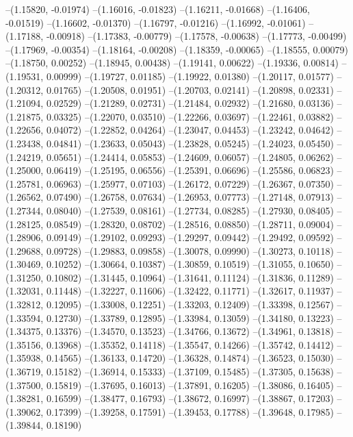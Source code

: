 --(1.15820, -0.01974)
--(1.16016, -0.01823)
--(1.16211, -0.01668)
--(1.16406, -0.01519)
--(1.16602, -0.01370)
--(1.16797, -0.01216)
--(1.16992, -0.01061)
--(1.17188, -0.00918)
--(1.17383, -0.00779)
--(1.17578, -0.00638)
--(1.17773, -0.00499)
--(1.17969, -0.00354)
--(1.18164, -0.00208)
--(1.18359, -0.00065)
--(1.18555, 0.00079)
--(1.18750, 0.00252)
--(1.18945, 0.00438)
--(1.19141, 0.00622)
--(1.19336, 0.00814)
--(1.19531, 0.00999)
--(1.19727, 0.01185)
--(1.19922, 0.01380)
--(1.20117, 0.01577)
--(1.20312, 0.01765)
--(1.20508, 0.01951)
--(1.20703, 0.02141)
--(1.20898, 0.02331)
--(1.21094, 0.02529)
--(1.21289, 0.02731)
--(1.21484, 0.02932)
--(1.21680, 0.03136)
--(1.21875, 0.03325)
--(1.22070, 0.03510)
--(1.22266, 0.03697)
--(1.22461, 0.03882)
--(1.22656, 0.04072)
--(1.22852, 0.04264)
--(1.23047, 0.04453)
--(1.23242, 0.04642)
--(1.23438, 0.04841)
--(1.23633, 0.05043)
--(1.23828, 0.05245)
--(1.24023, 0.05450)
--(1.24219, 0.05651)
--(1.24414, 0.05853)
--(1.24609, 0.06057)
--(1.24805, 0.06262)
--(1.25000, 0.06419)
--(1.25195, 0.06556)
--(1.25391, 0.06696)
--(1.25586, 0.06823)
--(1.25781, 0.06963)
--(1.25977, 0.07103)
--(1.26172, 0.07229)
--(1.26367, 0.07350)
--(1.26562, 0.07490)
--(1.26758, 0.07634)
--(1.26953, 0.07773)
--(1.27148, 0.07913)
--(1.27344, 0.08040)
--(1.27539, 0.08161)
--(1.27734, 0.08285)
--(1.27930, 0.08405)
--(1.28125, 0.08549)
--(1.28320, 0.08702)
--(1.28516, 0.08850)
--(1.28711, 0.09004)
--(1.28906, 0.09149)
--(1.29102, 0.09293)
--(1.29297, 0.09442)
--(1.29492, 0.09592)
--(1.29688, 0.09728)
--(1.29883, 0.09858)
--(1.30078, 0.09990)
--(1.30273, 0.10118)
--(1.30469, 0.10252)
--(1.30664, 0.10387)
--(1.30859, 0.10519)
--(1.31055, 0.10650)
--(1.31250, 0.10802)
--(1.31445, 0.10964)
--(1.31641, 0.11124)
--(1.31836, 0.11289)
--(1.32031, 0.11448)
--(1.32227, 0.11606)
--(1.32422, 0.11771)
--(1.32617, 0.11937)
--(1.32812, 0.12095)
--(1.33008, 0.12251)
--(1.33203, 0.12409)
--(1.33398, 0.12567)
--(1.33594, 0.12730)
--(1.33789, 0.12895)
--(1.33984, 0.13059)
--(1.34180, 0.13223)
--(1.34375, 0.13376)
--(1.34570, 0.13523)
--(1.34766, 0.13672)
--(1.34961, 0.13818)
--(1.35156, 0.13968)
--(1.35352, 0.14118)
--(1.35547, 0.14266)
--(1.35742, 0.14412)
--(1.35938, 0.14565)
--(1.36133, 0.14720)
--(1.36328, 0.14874)
--(1.36523, 0.15030)
--(1.36719, 0.15182)
--(1.36914, 0.15333)
--(1.37109, 0.15485)
--(1.37305, 0.15638)
--(1.37500, 0.15819)
--(1.37695, 0.16013)
--(1.37891, 0.16205)
--(1.38086, 0.16405)
--(1.38281, 0.16599)
--(1.38477, 0.16793)
--(1.38672, 0.16997)
--(1.38867, 0.17203)
--(1.39062, 0.17399)
--(1.39258, 0.17591)
--(1.39453, 0.17788)
--(1.39648, 0.17985)
--(1.39844, 0.18190)
